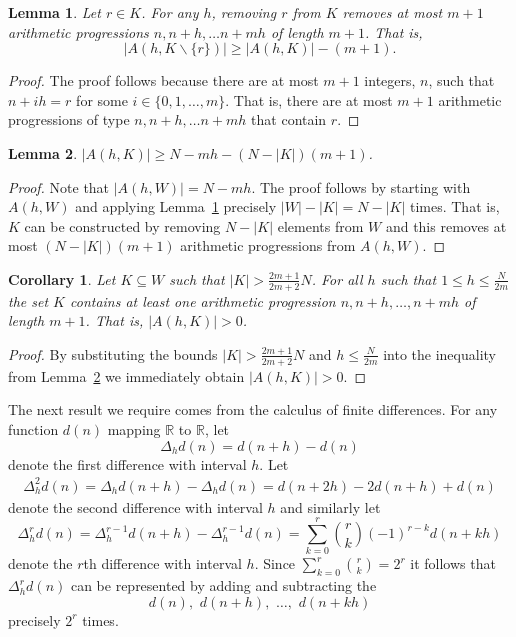 \documentclass[aap]{imsart}
\newcommand{\reals}{{\mathbb R}}
\newtheorem{corollary}{Corollary}
\newtheorem{lemma}{Lemma}
\begin{document}
\begin{lemma} \label{lem:S(h,G/r)size}
Let $r \in K$.  For any $h$, removing $r$ from $K$ removes at most $m+1$ arithmetic progressions $n, n+h, \dots n+mh$ of length $m+1$.  That is,
\[
|A(h,K \backslash \{r\})| \geq |A(h,K)| - (m+1).
\]
\end{lemma}
\begin{proof}
The proof follows because there are at most $m+1$ integers, $n$, such that $n+ih = r$ for some $i \in \{0,1,\dots,m\}$.  That is, there are at most $m+1$ arithmetic progressions of type $n, n+h, \dots n+mh$ that contain $r$.
\end{proof}

 \begin{lemma} \label{lem:S(h,K)size}
 $|A(h,K)| \geq N - mh - (N - |K|)(m+1)$.
 \end{lemma}
 \begin{proof}
 Note that $|A(h,W)| = N - mh$.  The proof follows by starting with $A(h,W)$ and applying Lemma~\ref{lem:S(h,G/r)size} precisely $|W|-|K|=N-|K|$ times. That is, $K$ can be constructed by removing $N - |K|$ elements from $W$ and this removes at most $(N - |K|)(m+1)$ arithmetic progressions from $A(h,W)$.
 \end{proof}
 
 \begin{corollary} \label{cor:S(h,K)>0}
 Let $K \subseteq W$ such that $|K| > \frac{2m+1}{2m+2}N$. For all $h$ such that $1\leq h \leq\frac{N}{2m}$ the set $K$ contains at least one arithmetic progression $n, n+h, \dots, n+mh$ of length $m+1$. That is, $|A(h,K)| > 0$.
 \end{corollary}
 \begin{proof}
 By substituting the bounds $|K| > \frac{2m+1}{2m+2}N$ and $h \leq\frac{N}{2m}$ into the inequality from Lemma~\ref{lem:S(h,K)size} we immediately obtain $|A(h,K)| > 0$.
 \end{proof}

The next result we require comes from the calculus of finite differences. For any function $d(n)$ mapping $\reals$ to $\reals$, let 
\[
\Delta_h d(n) = d(n+h) - d(n)
\] 
denote the first difference with interval $h$. Let 
\begin{align*}
\Delta_h^2 d(n) = \Delta_h d(n+h) - \Delta_h d(n) = d(n+2h) - 2d(n+h) + d(n)
\end{align*}
denote the second difference with interval $h$ and similarly let 
\begin{equation}\label{eq:mthdiffformula}
\Delta_h^r d(n) = \Delta_h^{r-1} d(n+h) - \Delta_h^{r-1} d(n) = \sum_{k=0}^{r}\binom{r}{k}(-1)^{r-k}d(n+kh)
\end{equation}
denote the $r$th difference with interval $h$. Since $\sum_{k=0}^{r}\binom{r}{k} = 2^r$ it follows that $\Delta_h^r d(n)$ can be represented by adding and subtracting the 
\[
d(n), \,\, d(n+h), \,\, \dots, \,\, d(n+kh)
\] 
precisely $2^r$ times.
\end{document}
